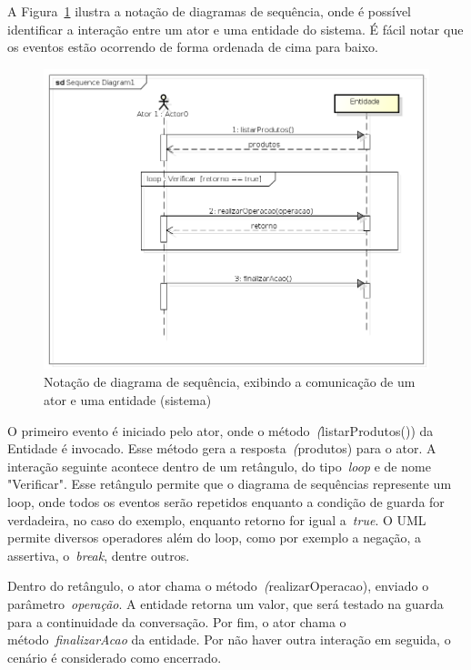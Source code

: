 A Figura~\ref{fig:exemplo-diagrama-sequencia} ilustra a notação de diagramas de sequência, onde é possível identificar a interação entre um ator e uma entidade do sistema. É fácil notar que os eventos estão ocorrendo de forma ordenada de cima para baixo.
\begin{figure}
	\centering
	\includegraphics[scale=0.75]{images/exemplo-diagrama-sequencia.png}
	\caption{Notação de diagrama de sequência, exibindo a comunicação de um ator e uma entidade (sistema)}
	\label{fig:exemplo-diagrama-sequencia}
\end{figure}

O primeiro evento é iniciado pelo ator, onde o método~\emph(listarProdutos()) da Entidade é invocado. Esse método gera a resposta~\emph(produtos) para o ator. A interação seguinte acontece dentro de um retângulo, do tipo~\emph{loop} e de nome "Verificar". Esse retângulo permite que o diagrama de sequências represente um loop, onde todos os eventos serão repetidos enquanto a condição de guarda for verdadeira, no caso do exemplo, enquanto retorno for igual a~\emph{true}. O UML permite diversos operadores além do loop, como por exemplo a negação, a assertiva, o~\emph{break}, dentre outros.

Dentro do retângulo, o ator chama o método~\emph(realizarOperacao), enviado o parâmetro~\emph{operação}. A entidade retorna um valor, que será testado na guarda para a continuidade da conversação. Por fim, o ator chama o método~\emph{finalizarAcao} da entidade. Por não haver outra interação em seguida, o cenário é considerado como encerrado. 

